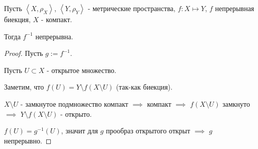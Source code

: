 \begin{theorem} \thmslashn

    Пусть $\left<X, \rho_{X}\right>$, $\left<Y, \rho_{Y}\right>$ - метрические пространства, $f : X \mapsto Y$, $f$ непрерывная биекция, $X$ - компакт.

    Тогда $f^{-1}$ непрерывна.
    \begin{proof} \thmslashn
    
        Пусть $g := f^{-1}$.

        Пусть $U \subset X$ - открытое множество.

        Заметим, что $f(U) = Y \setminus f(X \setminus U)$ (так-как биекция).

        $X \setminus U$ - замкнутое подмножество компакт $\implies$ компакт $\implies$ $f(X \setminus U)$ замкнуто $\implies$ $Y \setminus f(X \setminus U)$ - открыто.

        $f(U) = g^{-1}(U)$, значит для $g$ прообраз открытого открыт $\implies$ $g$ непрерывно.
    \end{proof}
\end{theorem}
